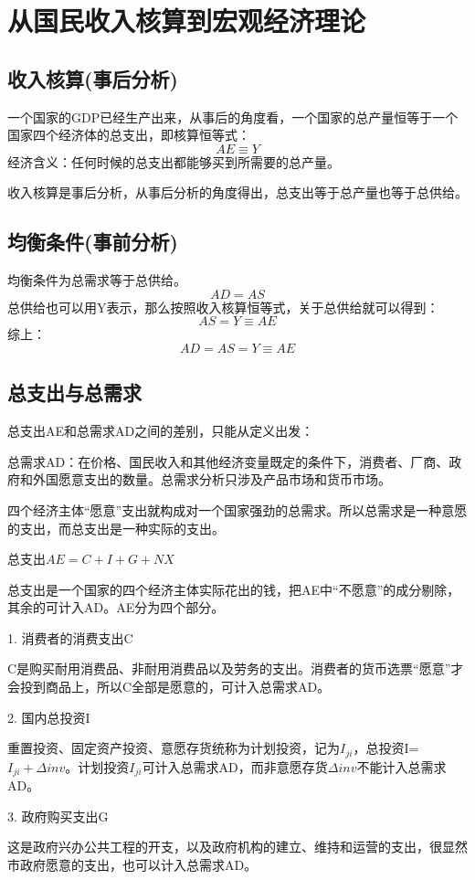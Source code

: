 \documentclass{article}
\begin{document}
\section{从国民收入核算到宏观经济理论}
\subsection{收入核算(事后分析)}
一个国家的GDP已经生产出来，从事后的角度看，一个国家的总产量恒等于一个国家四个经济体的总支出，即核算恒等式：
\[
AE\equiv Y
\]
经济含义：任何时候的总支出都能够买到所需要的总产量。

收入核算是事后分析，从事后分析的角度得出，总支出等于总产量也等于总供给。

\subsection{均衡条件(事前分析)}
均衡条件为总需求等于总供给。
\[
AD=AS
\]
总供给也可以用Y表示，那么按照收入核算恒等式，关于总供给就可以得到：
\[
AS=Y\equiv AE
\]
综上：
\[
AD=AS=Y\equiv AE
\]

\subsection{总支出与总需求}
总支出AE和总需求AD之间的差别，只能从定义出发：

总需求AD：在价格、国民收入和其他经济变量既定的条件下，消费者、厂商、政府和外国愿意支出的数量。总需求分析只涉及产品市场和货币市场。

四个经济主体“愿意”支出就构成对一个国家强劲的总需求。所以总需求是一种意愿的支出，而总支出是一种实际的支出。

总支出$ AE=C+I+G+NX $

总支出是一个国家的四个经济主体实际花出的钱，把AE中“不愿意”的成分剔除，其余的可计入AD。AE分为四个部分。

\hspace*{\fill}

1. 消费者的消费支出C

C是购买耐用消费品、非耐用消费品以及劳务的支出。消费者的货币选票“愿意”才会投到商品上，所以C全部是愿意的，可计入总需求AD。

2. 国内总投资I

重置投资、固定资产投资、意愿存货统称为计划投资，记为$ I_{ji} $，总投资I=$ I_{ji}+\Delta inv $。计划投资$ I_{ji} $可计入总需求AD，而非意愿存货$ \Delta inv $不能计入总需求AD。

3. 政府购买支出G

这是政府兴办公共工程的开支，以及政府机构的建立、维持和运营的支出，很显然市政府愿意的支出，也可以计入总需求AD。
\end{document}
